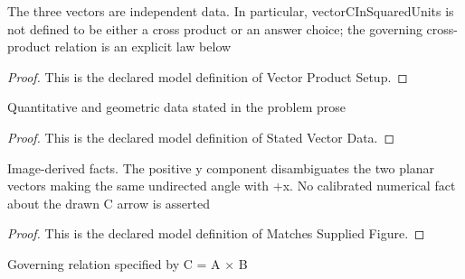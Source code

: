 \begin{definition}
  \label{def:physics:phyx-mini-0792:phyxminiproblems-problemphyxmini0792-vectorproductsetup}
  The three vectors are independent data. In particular, vectorCInSquaredUnits is not defined to be either a cross product or an answer choice; the governing cross-product relation is an explicit law below
\end{definition}
\begin{proof}
  This is the declared model definition of Vector Product Setup.
\end{proof}
\begin{definition}
  \label{def:physics:phyx-mini-0792:phyxminiproblems-problemphyxmini0792-statedvectordata}
  Quantitative and geometric data stated in the problem prose
\end{definition}
\begin{proof}
  This is the declared model definition of Stated Vector Data.
\end{proof}
\begin{definition}
  \label{def:physics:phyx-mini-0792:phyxminiproblems-problemphyxmini0792-matchessuppliedfigure}
  Image-derived facts. The positive y component disambiguates the two planar vectors making the same undirected angle with +x. No calibrated numerical fact about the drawn C arrow is asserted
\end{definition}
\begin{proof}
  This is the declared model definition of Matches Supplied Figure.
\end{proof}
\begin{definition}
  \label{def:physics:phyx-mini-0792:phyxminiproblems-problemphyxmini0792-satisfiesvectorproductlaw}
  Governing relation specified by C = A × B
\end{definition}
